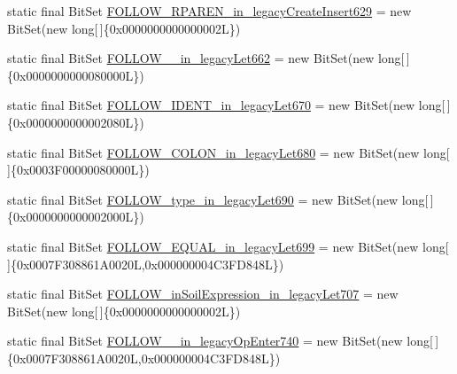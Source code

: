 \begin{DoxyCompactItemize}
\item 
static final Bit\-Set \hyperlink{classorg_1_1tzi_1_1use_1_1parser_1_1shell_1_1_shell_command_parser_a711a481bf8fd405b644a5c2e63aa4cf9}{F\-O\-L\-L\-O\-W\-\_\-\-R\-P\-A\-R\-E\-N\-\_\-in\-\_\-legacy\-Create\-Insert629} = new Bit\-Set(new long\mbox{[}$\,$\mbox{]}\{0x0000000000000002\-L\})
\item 
static final Bit\-Set \hyperlink{classorg_1_1tzi_1_1use_1_1parser_1_1shell_1_1_shell_command_parser_a7890ede5bec78f93df60bfa27336a61f}{F\-O\-L\-L\-O\-W\-\_\-\_\-in\-\_\-legacy\-Let662} = new Bit\-Set(new long\mbox{[}$\,$\mbox{]}\{0x0000000000080000\-L\})
\item 
static final Bit\-Set \hyperlink{classorg_1_1tzi_1_1use_1_1parser_1_1shell_1_1_shell_command_parser_aa33eabc2bedf456c44ad9de3e1b06a5e}{F\-O\-L\-L\-O\-W\-\_\-\-I\-D\-E\-N\-T\-\_\-in\-\_\-legacy\-Let670} = new Bit\-Set(new long\mbox{[}$\,$\mbox{]}\{0x0000000000002080\-L\})
\item 
static final Bit\-Set \hyperlink{classorg_1_1tzi_1_1use_1_1parser_1_1shell_1_1_shell_command_parser_a8e851eded0e6461de323e13fabc5d7ba}{F\-O\-L\-L\-O\-W\-\_\-\-C\-O\-L\-O\-N\-\_\-in\-\_\-legacy\-Let680} = new Bit\-Set(new long\mbox{[}$\,$\mbox{]}\{0x0003\-F00000080000\-L\})
\item 
static final Bit\-Set \hyperlink{classorg_1_1tzi_1_1use_1_1parser_1_1shell_1_1_shell_command_parser_a564425848e2e21be491654c8cde2f95e}{F\-O\-L\-L\-O\-W\-\_\-type\-\_\-in\-\_\-legacy\-Let690} = new Bit\-Set(new long\mbox{[}$\,$\mbox{]}\{0x0000000000002000\-L\})
\item 
static final Bit\-Set \hyperlink{classorg_1_1tzi_1_1use_1_1parser_1_1shell_1_1_shell_command_parser_a0405164290f5b9029e6d0588b14c6940}{F\-O\-L\-L\-O\-W\-\_\-\-E\-Q\-U\-A\-L\-\_\-in\-\_\-legacy\-Let699} = new Bit\-Set(new long\mbox{[}$\,$\mbox{]}\{0x0007\-F308861\-A0020\-L,0x000000004\-C3\-F\-D848\-L\})
\item 
static final Bit\-Set \hyperlink{classorg_1_1tzi_1_1use_1_1parser_1_1shell_1_1_shell_command_parser_a887fdb795820c5a4cf22409d873ecebf}{F\-O\-L\-L\-O\-W\-\_\-in\-Soil\-Expression\-\_\-in\-\_\-legacy\-Let707} = new Bit\-Set(new long\mbox{[}$\,$\mbox{]}\{0x0000000000000002\-L\})
\item 
static final Bit\-Set \hyperlink{classorg_1_1tzi_1_1use_1_1parser_1_1shell_1_1_shell_command_parser_a6b3b277db13d5626db26f4b2d563bd9e}{F\-O\-L\-L\-O\-W\-\_\-\_\-in\-\_\-legacy\-Op\-Enter740} = new Bit\-Set(new long\mbox{[}$\,$\mbox{]}\{0x0007\-F308861\-A0020\-L,0x000000004\-C3\-F\-D848\-L\})

\end{DoxyCompactItemize}
